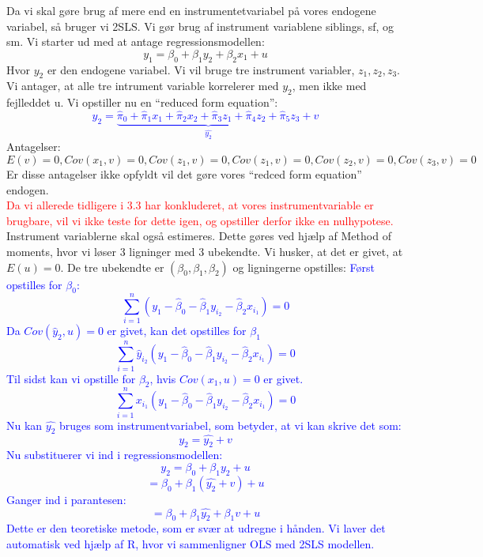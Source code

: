 \documentclass[
  10pt,
]{article}
\begin{document}
Da vi skal gøre brug af mere end en instrumentetvariabel på vores
endogene variabel, så bruger vi 2SLS. Vi gør brug af instrument
variablene siblings, sf, og sm. Vi starter ud med at antage
regressionsmodellen: \[ y_1 = \beta_0 + \beta_1y_2+\beta_2x_1+u\] Hvor
\(y_2\) er den endogene variabel. Vi vil bruge tre instrument variabler,
\(z_1, z_2, z_3\). Vi antager, at alle tre intrument variable korrelerer
med \(y_2\), men ikke med fejlleddet u. Vi opstiller nu en ``reduced
form equation'':
\textcolor{blue}{\[ y_2=\underbrace{\hat\pi_0+\hat\pi_1x_1+\hat\pi_2x_2+\hat\pi_3z_1+\hat\pi_4z_2+\hat\pi_5z_3}_{\hat{y_2}}+v\] }
Antagelser:
\[E(v)=0, Cov(x_1,v)=0, Cov(z_1,v)=0, Cov(z_1,v)=0, Cov(z_2,v)=0, Cov(z_3,v)=0  \]
Er disse antagelser ikke opfyldt vil det gøre vores ``redced form
equation'' endogen.\\
\textcolor{red}{Da vi allerede tidligere i 3.3 har konkluderet, at vores instrumentvariable er brugbare, vil vi ikke teste for dette igen, og opstiller derfor ikke en nulhypotese.}
\newline Instrument variablerne skal også estimeres. Dette gøres ved
hjælp af Method of moments, hvor vi løser 3 ligninger med 3 ubekendte.
Vi husker, at det er givet, at \(E(u)=0\). De tre ubekendte er
\((\beta_0,\beta_1,\beta_2)\) og ligningerne opstilles:
\textcolor{blue}{Først opstilles for $\beta_0$:
\[\sum\limits_{i=1}^n(y_1-\hat{\beta}_0-\hat{\beta}_1y_{i_2}-\hat{\beta}_2x_{i_1})=0 \]
Da $Cov(\hat{y}_2,u)=0$ er givet, kan det opstilles for $\beta_1$ 
\[\sum\limits_{i=1}^n\hat{y}_{i_2}(y_1-\hat{\beta}_0-\hat{\beta}_1y_{i_2}-\hat{\beta}_2x_{i_1})=0 \]
Til sidst kan vi opstille for $\beta_2$, hvis $Cov(x_1,u)=0$ er givet.
\[\sum\limits_{i=1}^nx_{i_1}(y_1-\hat{\beta}_0-\hat{\beta}_1y_{i_2}-\hat{\beta}_2x_{i_1})=0 \]
Nu kan $\hat{y_2}$ bruges som instrumentvariabel, som betyder, at vi kan skrive det som:
\[ y_2=\hat{y_2}+v\]
Nu substituerer vi ind i regressionsmodellen:
\[ y_2=\beta_0+\beta_1y_2+u\]
\[ =\beta_0+\beta_1(\hat{y_2}+v)+u \]
Ganger ind i parantesen:
\[ =\beta_0+\beta_1\hat{y_2}+\beta_1v+u  \]
Dette er den teoretiske metode, som er svær at udregne i hånden. Vi laver det automatisk ved hjælp af R, 
hvor vi sammenligner OLS med 2SLS modellen. }
\end{document}
